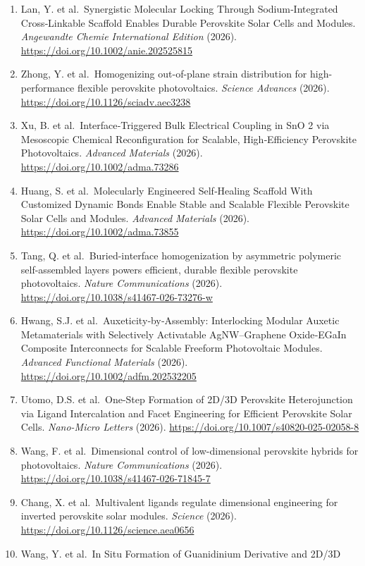 \documentclass[
  11pt,
]{article}
\begin{document}
\begin{enumerate}
\item
  Lan, Y. et al.~Synergistic Molecular Locking Through Sodium‐Integrated
  Cross‐Linkable Scaffold Enables Durable Perovskite Solar Cells and
  Modules. \emph{Angewandte Chemie International Edition} (2026).
  \url{https://doi.org/10.1002/anie.202525815}
\item
  Zhong, Y. et al.~Homogenizing out-of-plane strain distribution for
  high-performance flexible perovskite photovoltaics. \emph{Science
  Advances} (2026). \url{https://doi.org/10.1126/sciadv.aec3238}
\item
  Xu, B. et al.~Interface‐Triggered Bulk Electrical Coupling in SnO 2
  via Mesoscopic Chemical Reconfiguration for Scalable, High‐Efficiency
  Perovskite Photovoltaics. \emph{Advanced Materials} (2026).
  \url{https://doi.org/10.1002/adma.73286}
\item
  Huang, S. et al.~Molecularly Engineered Self‐Healing Scaffold With
  Customized Dynamic Bonds Enable Stable and Scalable Flexible
  Perovskite Solar Cells and Modules. \emph{Advanced Materials} (2026).
  \url{https://doi.org/10.1002/adma.73855}
\item
  Tang, Q. et al.~Buried-interface homogenization by asymmetric
  polymeric self-assembled layers powers efficient, durable flexible
  perovskite photovoltaics. \emph{Nature Communications} (2026).
  \url{https://doi.org/10.1038/s41467-026-73276-w}
\item
  Hwang, S.J. et al.~Auxeticity‐by‐Assembly: Interlocking Modular
  Auxetic Metamaterials with Selectively Activatable AgNW--Graphene
  Oxide‐EGaIn Composite Interconnects for Scalable Freeform Photovoltaic
  Modules. \emph{Advanced Functional Materials} (2026).
  \url{https://doi.org/10.1002/adfm.202532205}
\item
  Utomo, D.S. et al.~One-Step Formation of 2D/3D Perovskite
  Heterojunction via Ligand Intercalation and Facet Engineering for
  Efficient Perovskite Solar Cells. \emph{Nano-Micro Letters} (2026).
  \url{https://doi.org/10.1007/s40820-025-02058-8}
\item
  Wang, F. et al.~Dimensional control of low-dimensional perovskite
  hybrids for photovoltaics. \emph{Nature Communications} (2026).
  \url{https://doi.org/10.1038/s41467-026-71845-7}
\item
  Chang, X. et al.~Multivalent ligands regulate dimensional engineering
  for inverted perovskite solar modules. \emph{Science} (2026).
  \url{https://doi.org/10.1126/science.aea0656}
\item
  Wang, Y. et al.~In Situ Formation of Guanidinium Derivative and 2D/3D

\end{enumerate}
\end{document}
